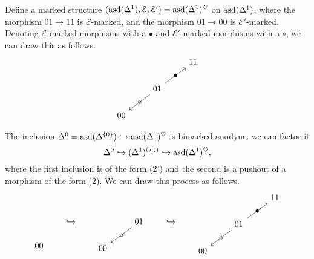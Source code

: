\documentclass[main.tex]{subfiles}
\begin{document}
\begin{example}
  \label{eg:bimarking_on_asd_delta1}
  Define a marked structure $(\mathrm{asd}(\Delta^{1}), \mathcal{E}, \mathcal{E}') = \mathrm{asd}(\Delta^{1})^{\heartsuit}$ on $\mathrm{asd}(\Delta^{1})$, where the morphism $01 \to 11$ is $\mathcal{E}$-marked, and the morphism $01 \to 00$ is $\mathcal{E}'$-marked. Denoting $\mathcal{E}$-marked morphisms with a $\bullet$ and $\mathcal{E}'$-marked morphisms with a $\circ$, we can draw this as follows.
  \begin{equation*}
    \begin{tikzcd}
      && 11
      \\
      & 01
      \arrow[ur, "\bullet" marking]
      \arrow[dl, "\circ" marking]
      \\
      00
    \end{tikzcd}
  \end{equation*}

  The inclusion $\Delta^{0} = \mathrm{asd}(\Delta^{\{0\}}) \hookrightarrow \mathrm{asd}(\Delta^{1})^{\heartsuit}$ is bimarked anodyne: we can factor it
  \begin{equation*}
    \Delta^{0} \hookrightarrow (\Delta^{1})^{(\flat, \sharp)} \hookrightarrow \mathrm{asd}(\Delta^{1})^{\heartsuit},
  \end{equation*}
  where the first inclusion is of the form (2') and the second is a pushout of a morphism of the form (2). We can draw this process as follows.
  \begin{equation*}
    \begin{tikzcd}
      \ 
      \\
      \ 
      \\
      00
    \end{tikzcd}
    \qquad\hookrightarrow\qquad
    \begin{tikzcd}
      & \ 
      \\
      & 01
      \arrow[dl, "\circ" marking]
      \\
      00
    \end{tikzcd}
    \qquad\hookrightarrow\qquad
    \begin{tikzcd}
      && 11
      \\
      & 01
      \arrow[ur, "\bullet" marking]
      \arrow[dl, "\circ" marking]
      \\
      00
    \end{tikzcd}
  \end{equation*}
\end{example}
\end{document}
